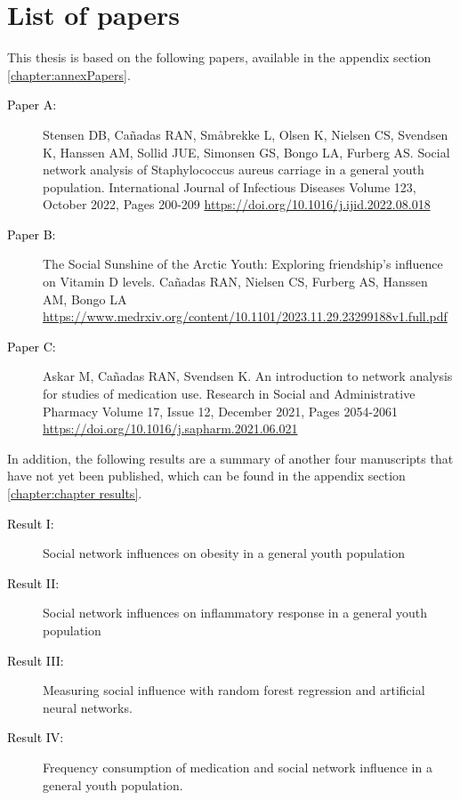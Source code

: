 \chapter*{List of papers}
\label{chapter:chapterListPapers}

    This thesis is based on the following papers, available in the appendix section \ref{chapter:annexPapers}.
    
   \begin{description}

        \item[\colorbox{PaperColor}{\textcolor{black}{Paper A:}}]{ Stensen DB, Cañadas RAN, Småbrekke L, Olsen K, Nielsen CS, Svendsen K, Hanssen AM, Sollid JUE, Simonsen GS, Bongo LA, Furberg AS. Social network analysis of Staphylococcus aureus carriage in a general youth population. International Journal of Infectious Diseases Volume 123, October 2022, Pages 200-209 \url{https://doi.org/10.1016/j.ijid.2022.08.018}}

        \item[\colorbox{PaperColor}{\textcolor{black}{Paper B:}}]{ The Social Sunshine of the Arctic Youth: Exploring friendship's influence on Vitamin D levels. Cañadas RAN, Nielsen CS, Furberg AS, Hanssen AM, Bongo LA \url{https://www.medrxiv.org/content/10.1101/2023.11.29.23299188v1.full.pdf}}
        
        \item[\colorbox{PaperColor}{\textcolor{black}{Paper C:}}] { Askar M, Cañadas RAN, Svendsen K. An introduction to network analysis for studies of medication use. Research in Social and Administrative Pharmacy Volume 17, Issue 12, December 2021, Pages 2054-2061 \url{https://doi.org/10.1016/j.sapharm.2021.06.021}}        

    \end{description}

    In addition, the following results are a summary of another four manuscripts that have not yet been published, which can be found in the appendix section \ref{chapter:chapter results}. 

    \begin{description}

        \item[\colorbox{ResultColor}{\textcolor{black}{Result I:}}]{Social network influences on obesity in a general youth population}

        \item[\colorbox{ResultColor}{\textcolor{black}{Result II:}}]{Social network influences on inflammatory response in a general youth population}

        \item[\colorbox{ResultColor}{\textcolor{black}{Result III:}}]{Measuring social influence with random forest regression and artificial neural networks.}

        \item[\colorbox{ResultColor}{\textcolor{black}{Result IV:}}]{Frequency consumption of medication and social network influence in a general youth population.}
        
    \end{description}